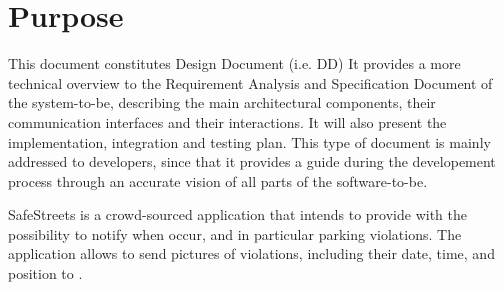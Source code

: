 \documentclass[../../DD.tex]{subfiles}
\begin{document}
\section{Purpose\label{sect:1.1}}
This document constitutes Design Document (i.e. DD) It provides a more technical overview to the Requirement Analysis and Specification Document of the system-to-be, describing the main architectural components, their communication interfaces and their interactions. It will also present the implementation, integration and testing plan. This type of document is mainly addressed to developers, since that it provides a guide during the developement process through an accurate vision of all parts of the software-to-be. \newline

SafeStreets is a crowd-sourced application that intends to provide  with the possibility to notify  when  occur, and in particular parking violations. The application allows  to send pictures of violations, including their date, time, and position to .
\end{document}
